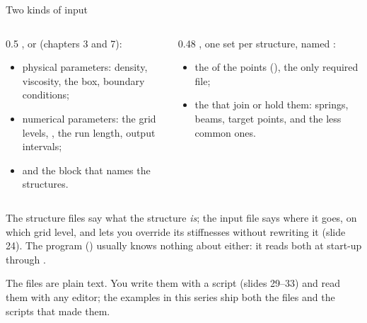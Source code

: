 \documentclass[aspectratio=169,11pt]{beamer}
\begin{document}
\begin{frame}{Two kinds of input}
\begin{columns}[T,onlytextwidth]
\begin{column}{0.5\textwidth}
,  or  (chapters 3 and 7):
\begin{itemize}
  \item physical parameters: density, viscosity, the box, boundary conditions;
  \item numerical parameters: the grid levels, , the run length, output intervals;
  \item and the block that names the structures.
\end{itemize}
\end{column}
\begin{column}{0.48\textwidth}
, one set per structure, named :
\begin{itemize}
  \item the  of the points (), the only required file;
  \item the  that join or hold them: springs, beams, target points, and the less common ones.
\end{itemize}
\end{column}
\end{columns}
\vspace{2mm}
\begin{punchbox}
\small The structure files say what the structure \emph{is}; the input file says where it goes, on which grid level, and lets you override its stiffnesses without rewriting it (slide 24). The program () usually knows nothing about either: it reads both at start-up through .
\end{punchbox}
\small The files are plain text. You write them with a script (slides 29--33) and read them with any editor; the examples in this series ship both the files and the scripts that made them.
\end{frame}
\end{document}

